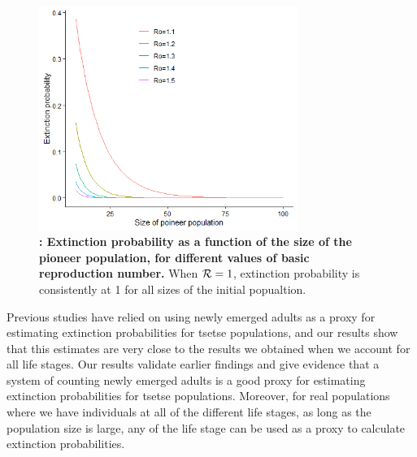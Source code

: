 \documentclass[smallextended]{svjour3}
\begin{document}
\begin{figure}[h]
	\includegraphics[width=0.75\textwidth]{ExtinctionRepNumberPoineerPop.png}
	\caption{{\bf: Extinction probability as a function of the size of the pioneer population, for different values of basic reproduction number.} When ${\cal R}=1$, extinction probability is consistently at 1 for all sizes of the initial popualtion.}
	\label{ExtPoineerSize}
\end{figure}

Previous studies have relied on using newly emerged adults as a proxy for estimating extinction probabilities for tsetse populations, and our results show that this estimates are very close to the results we obtained when we account for all life stages. Our results validate earlier findings and give evidence that a system of counting newly emerged adults is a good proxy for estimating extinction probabilities for tsetse populations. Moreover, for real populations where we have individuals at all of the different life stages, as long as the population size is large, any of the life stage can be used as a proxy to calculate extinction probabilities. 
\end{document}
